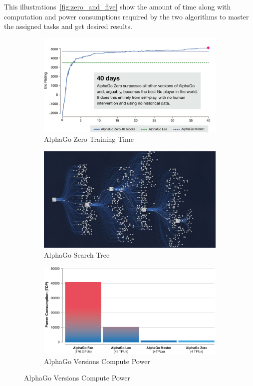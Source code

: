 This illustrations~\ref{fig:zero_and_five} show the amount of time along with computation and power consumptions required by the two algorithms to master the assigned tasks and get desired results. 

\begin{figure}[!htb]
	\centering
	\begin{subfigure}[b]{0.3\textwidth}
		\centering
		\includegraphics[width=\textwidth]{figures/rl/alphago_zero.png}
		\caption{AlphaGo Zero Training Time}
		\label{fig:alphago_train}
	\end{subfigure}
	\hfill
	\begin{subfigure}[b]{0.3\textwidth}
		\centering
		\includegraphics[width=\textwidth]{figures/rl/alphago_search_tree.png}
		\caption{AlphaGo Search Tree}
		\label{fig:alphago_search_tree}
	\end{subfigure}
	\hfill
	\begin{subfigure}[b]{0.3\textwidth}
		\centering
		\includegraphics[width=\textwidth]{figures/rl/alphago_power.png}
		\caption{AlphaGo Versions Compute Power}
		\label{fig:alphago_power}
	\end{subfigure}
	\hfill
	

\end{figure}

